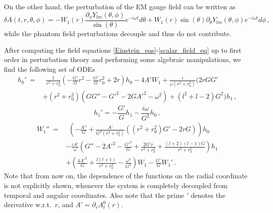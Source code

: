 \documentclass[11pt,a4paper]{article}
\begin{document}
On the other hand, the perturbation of the EM gauge field can be written as
%
\begin{equation}
    \delta A(t,r,\theta,\phi)=-W_1(r)\frac{\partial_{\phi}Y_{lm}(\theta,\phi)}{\sin{(\theta)}}e^{-i\omega t}d\theta+W_1(r)\sin{(\theta)}\partial_{\theta}Y_{lm}(\theta,\phi)e^{-i\omega t}d\phi \,,
\end{equation}
while the phantom field perturbations decouple and thus do not contribute.

After computing the field equations \eqref{Einstein_eqs}-\eqref{scalar_field_eq} up to first order in perturbation theory and performing some algebraic manipulations, we find the following set of ODEs
%
\begin{equation}\label{eq_h0_axial}
\begin{split}
    h_0'\:= & \:\:\frac{1}{r^2+r_0^2}\left(-\frac{G'}{G}r^2-\frac{G'}{G}r_0^2+2r\right)h_0-4A'W_1+\frac{i}{\omega(r^2+r_0^2)}\biggl(2rGG' \\
    & + (r^2+r_0^2)(GG''-G'^2-2GA'^2-\omega^2)+(l^2+l-2)G^2\biggr)h_1\,,
\end{split}
\end{equation}
%
\begin{equation}\label{eq_h1_axial}
    h_1'=-\frac{G'}{G}h_1-\frac{i\omega}{G^2}h_0 \,,
\end{equation}
%
\begin{equation}\label{eq_W1_axial}
    \begin{split}
    W_1''\:= & \:\:\left(-\frac{A''}{G}+\frac{A'}{G^2(r^2+r_0^2)}\left((r^2+r_0^2)G'-2rG\right)\right)h_0\\
    & -\frac{iA'}{\omega}\left(G''-2A'^2-\frac{G'^2}{G}+\frac{2G'r}{r^2+r_0^2}+\frac{(l+2)(l-1)G}{r^2+r_0^2}\right)h_1\\
    & +\left(\frac{4A'^2}{G}+\frac{l(l+1)}{r^2+r_0^2}-\frac{\omega^2}{G^2}\right)W_1-\frac{G'}{G}W_1'\,.
\end{split}
\end{equation}
%
Note that from now on, the dependence of the functions on the radial coordinate is not explicitly shown, whenever the system is completely decoupled from temporal and angular coordinates. 
Also note that the prime $'$ denotes the derivative w.r.t.~$r$, and $A'=\partial_r A^0_{t}(r)$.
\end{document}
